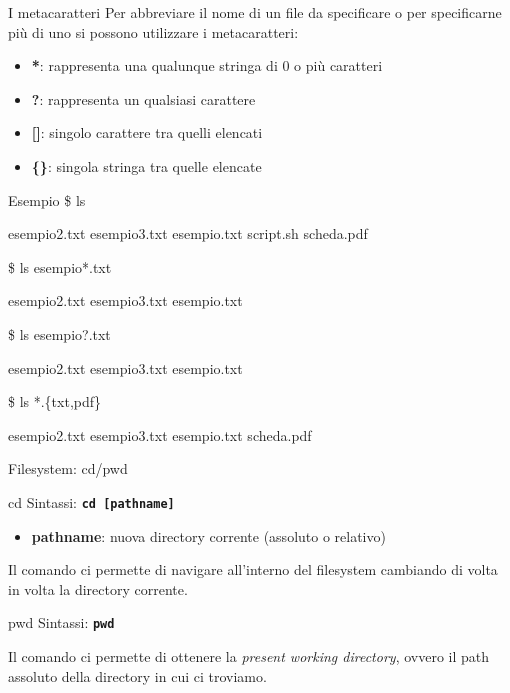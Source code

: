 \documentclass{beamer}
\begin{document}
    \begin{frame}{I metacaratteri}
        Per abbreviare il nome di un file da specificare o per specificarne più di uno
        si possono utilizzare i metacaratteri:
        \begin{itemize}
            \item \textbf{*}: rappresenta una qualunque stringa di 0 o più caratteri
            \item \textbf{?}: rappresenta un qualsiasi carattere
            \item \textbf{[]}: singolo carattere tra quelli elencati
            \item \textbf{\{\}}: singola stringa tra quelle elencate
        \end{itemize}
        \begin{exampleblock}{Esempio}
            \$ ls

            esempio2.txt esempio3.txt esempio.txt script.sh scheda.pdf

            \$ ls esempio*.txt

            esempio2.txt esempio3.txt esempio.txt

            \$ ls esempio?.txt

            esempio2.txt esempio3.txt esempio.txt

            \$ ls *.\{txt,pdf\}

            esempio2.txt esempio3.txt esempio.txt scheda.pdf
        \end{exampleblock}
    \end{frame}

    \begin{frame}{Filesystem: cd/pwd}
        \begin{block}{cd}
            Sintassi: \texttt{\textbf{cd [pathname]}}
            
            \begin{itemize}
                \item \textbf{pathname}: nuova directory corrente (assoluto o relativo)
            \end{itemize}

            Il comando ci permette di navigare all'interno del
            filesystem cambiando di volta in volta la directory corrente.
        \end{block}

        \begin{block}{pwd}
            Sintassi: \texttt{\textbf{pwd}}

            Il comando ci permette di ottenere la \textit{present working directory}, ovvero il path assoluto
            della directory in cui ci troviamo.
        \end{block}
    \end{frame}
\end{document}
